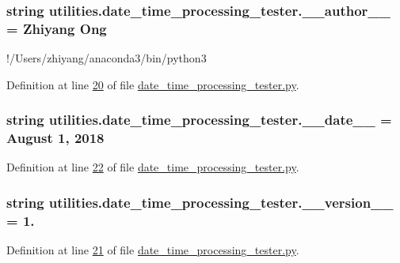 \subsubsection[{\+\_\+\+\_\+author\+\_\+\+\_\+}]{\setlength{\rightskip}{0pt plus 5cm}string utilities.\+date\+\_\+time\+\_\+processing\+\_\+tester.\+\_\+\+\_\+author\+\_\+\+\_\+ = \textquotesingle{}Zhiyang Ong\textquotesingle{}}\label{namespaceutilities_1_1date__time__processing__tester_ae1106460c338050149a3f7aa6690002a}


!/\+Users/zhiyang/anaconda3/bin/python3 



Definition at line \hyperlink{date__time__processing__tester_8py_source_l00020}{20} of file \hyperlink{date__time__processing__tester_8py_source}{date\+\_\+time\+\_\+processing\+\_\+tester.\+py}.

\hypertarget{namespaceutilities_1_1date__time__processing__tester_a3cf1bc57db206c3849901a593e205b09}{}
\subsubsection[{\+\_\+\+\_\+date\+\_\+\+\_\+}]{\setlength{\rightskip}{0pt plus 5cm}string utilities.\+date\+\_\+time\+\_\+processing\+\_\+tester.\+\_\+\+\_\+date\+\_\+\+\_\+ = \textquotesingle{}August 1, 2018\textquotesingle{}}\label{namespaceutilities_1_1date__time__processing__tester_a3cf1bc57db206c3849901a593e205b09}


Definition at line \hyperlink{date__time__processing__tester_8py_source_l00022}{22} of file \hyperlink{date__time__processing__tester_8py_source}{date\+\_\+time\+\_\+processing\+\_\+tester.\+py}.

\hypertarget{namespaceutilities_1_1date__time__processing__tester_a98cf80a86a0ee83e7b23e071b489b6b8}{}
\subsubsection[{\+\_\+\+\_\+version\+\_\+\+\_\+}]{\setlength{\rightskip}{0pt plus 5cm}string utilities.\+date\+\_\+time\+\_\+processing\+\_\+tester.\+\_\+\+\_\+version\+\_\+\+\_\+ = \textquotesingle{}1.\textquotesingle{}}\label{namespaceutilities_1_1date__time__processing__tester_a98cf80a86a0ee83e7b23e071b489b6b8}


Definition at line \hyperlink{date__time__processing__tester_8py_source_l00021}{21} of file \hyperlink{date__time__processing__tester_8py_source}{date\+\_\+time\+\_\+processing\+\_\+tester.\+py}.

